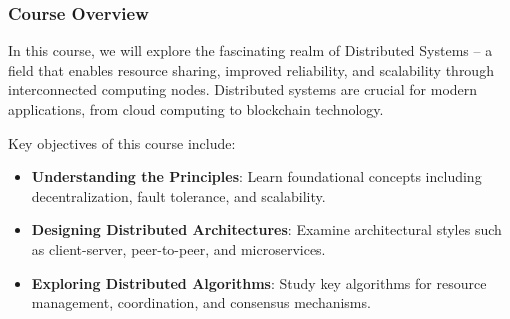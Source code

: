 \documentclass[aspectratio=169]{beamer}
\begin{document}
\begin{frame}[fragile]
    \frametitle{Course Overview}
    In this course, we will explore the fascinating realm of Distributed Systems – a field that enables resource sharing, improved reliability, and scalability through interconnected computing nodes. Distributed systems are crucial for modern applications, from cloud computing to blockchain technology.
    
    Key objectives of this course include:
    \begin{itemize}
        \item \textbf{Understanding the Principles}: Learn foundational concepts including decentralization, fault tolerance, and scalability.
        \item \textbf{Designing Distributed Architectures}: Examine architectural styles such as client-server, peer-to-peer, and microservices.
        \item \textbf{Exploring Distributed Algorithms}: Study key algorithms for resource management, coordination, and consensus mechanisms.
    \end{itemize}
\end{frame}
\end{document}
